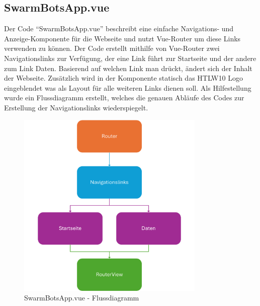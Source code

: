 \subsection{SwarmBotsApp.vue}
\label{subsec:frontend_SwarmBotsApp.vue}
Der Code ``SwarmBotsApp.vue'' beschreibt eine einfache Navigations- und Anzeige-Komponente
für die Webseite und nutzt Vue-Router um diese Links verwenden zu können.  
%
Der Code erstellt mithilfe von Vue-Router zwei Navigationslinks zur Verfügung,
der eine Link führt zur Startseite und der andere zum Link Daten. 
%
Basierend auf welchen Link man drückt, ändert sich der Inhalt der Webseite.
%
Zusätzlich wird in der Komponente statisch das HTLW10 Logo eingeblendet was als Layout für alle weiteren 
Links dienen soll. 
%
Als Hilfestellung wurde ein Flussdiagramm erstellt, 
welches die genauen Abläufe des Codes zur Erstellung der Navigationslinks wiederspiegelt.
\begin{figure}[H]
  \includegraphics[width=0.8\textwidth, center]{img/SwarmBotsApp_FD.png}
  \caption{SwarmBotsApp.vue - Flussdiagramm}
  \label{fig:SwarmBotsApp_Flowchart}
\end{figure}

